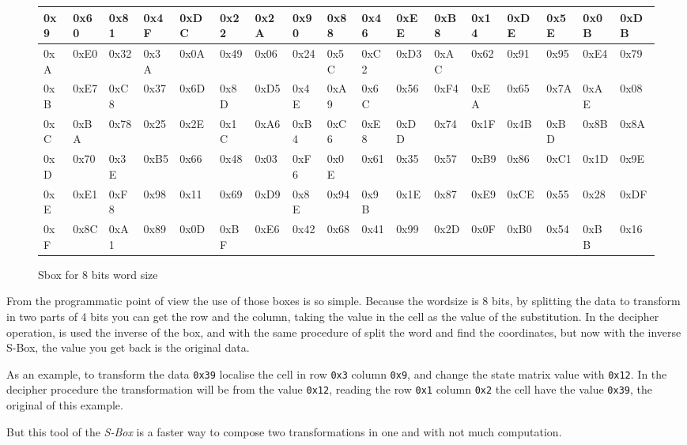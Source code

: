 \documentclass[a4paper,twoside]{llncs}
\begin{document}
\begin{figure}[b]
{\begin{center}
\begin{tabular}[]{|l||l|l|l|l|l|l|l|l|l|l|l|l|l|l|l|l|}
0x9 & 0x60 & 0x81 & 0x4F & 0xDC & 0x22 & 0x2A & 0x90 & 0x88 & 0x46 & 0xEE & 0xB8 & 0x14 & 0xDE & 0x5E & 0x0B & 0xDB \\\hline
0xA & 0xE0 & 0x32 & 0x3A & 0x0A & 0x49 & 0x06 & 0x24 & 0x5C & 0xC2 & 0xD3 & 0xAC & 0x62 & 0x91 & 0x95 & 0xE4 & 0x79 \\\hline
0xB & 0xE7 & 0xC8 & 0x37 & 0x6D & 0x8D & 0xD5 & 0x4E & 0xA9 & 0x6C & 0x56 & 0xF4 & 0xEA & 0x65 & 0x7A & 0xAE & 0x08 \\\hline
0xC & 0xBA & 0x78 & 0x25 & 0x2E & 0x1C & 0xA6 & 0xB4 & 0xC6 & 0xE8 & 0xDD & 0x74 & 0x1F & 0x4B & 0xBD & 0x8B & 0x8A \\\hline
0xD & 0x70 & 0x3E & 0xB5 & 0x66 & 0x48 & 0x03 & 0xF6 & 0x0E & 0x61 & 0x35 & 0x57 & 0xB9 & 0x86 & 0xC1 & 0x1D & 0x9E \\\hline
0xE & 0xE1 & 0xF8 & 0x98 & 0x11 & 0x69 & 0xD9 & 0x8E & 0x94 & 0x9B & 0x1E & 0x87 & 0xE9 & 0xCE & 0x55 & 0x28 & 0xDF \\\hline
0xF & 0x8C & 0xA1 & 0x89 & 0x0D & 0xBF & 0xE6 & 0x42 & 0x68 & 0x41 & 0x99 & 0x2D & 0x0F & 0xB0 & 0x54 & 0xBB & 0x16 \\\hline
\end{tabular}
\end{center}}
\caption{Sbox for 8 bits word size}
\label{tab:sbox8}
\end{figure}

From the programmatic point of view the use of those boxes is so simple. Because the wordsize is 8 bits, by splitting the data to transform in two parts of 4 bits you can get the row and the column, taking the value in the cell as the value of the substitution. In the decipher operation, is used the inverse of the box, and with the same procedure of split the word and find the coordinates, but now with the inverse S-Box, the value you get back is the original data.

As an example, to transform the data \texttt{0x39} localise the cell in row \texttt{0x3} column \texttt{0x9}, and change the state matrix value with \texttt{0x12}. In the decipher procedure the transformation will be from the value \texttt{0x12}, reading the row \texttt{0x1} column \texttt{0x2} the cell have the value \texttt{0x39}, the original of this example.


But this tool of the \emph{S-Box} is a faster way to compose two transformations in one and with not much computation.
\end{document}
